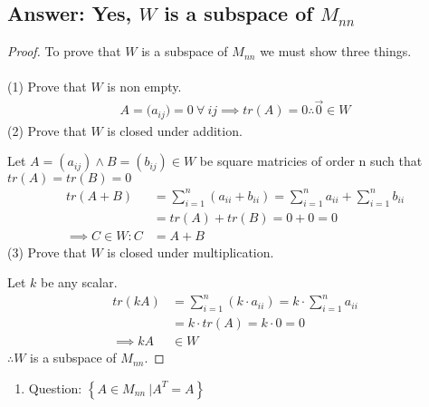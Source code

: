 \documentclass[12pt]{article}
\newcommand{\DS} [1] {${\displaystyle #1}$}
\begin{document}
\subsection{Answer: Yes, $W$ is a subspace of $M_{nn}$}
\begin{proof}
        To prove that $W$ is a subspace of $M_{nn}$ we must show three things.\\\\
        (1) Prove that $W$ is non empty.
        \begin{align*}
                A=({a_{ij})=0}\ \forall\ ij \implies tr(A)=0 \therefore \vec{0} \in W
        \end{align*}
        (2) Prove that $W$ is closed under addition.

        Let $A = ({a_{ij}})\land B = ({b_{ij}})\in W$ be square matricies of order n such that $tr(A) = tr(B) = 0$
        \begin{align*}
                tr(A+B)             & = \sum_{i = 1}^{n}(a_{ii}+b_{ii}) = \sum_{i = 1}^{n}a_{ii} + \sum_{i = 1}^{n}b_{ii} \\
                                    & = tr(A) + tr(B) = 0 + 0 = 0                                                         \\
                \implies C\in W : C & = A+B
        \end{align*}
        (3) Prove that $W$ is closed under multiplication.

        Let ${k}$ be any scalar.
        \begin{align*}
                tr(kA)      & = \sum_{i = 1}^{n}(k\cdot a_{ii}) = k\cdot \sum_{i = 1}^{n}a_{ii} \\
                            & = k\cdot tr(A) = k\cdot 0 = 0                                     \\
                \implies kA & \in W
        \end{align*}
        $\therefore W$ is a subspace of $M_{nn}$.
\end{proof}
\pagebreak
\begin{enumerate}
        \item [3.c]Question: \DS{ \left\{A \in{M_{nn}} \ | A^T = A \right\}}
\end{enumerate}
\end{document}

